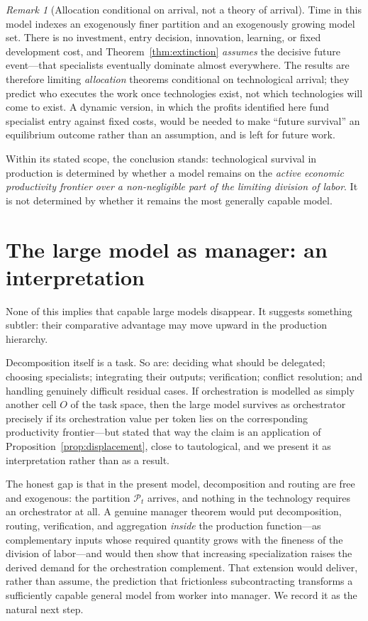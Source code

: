 \documentclass[11pt]{article}
\theoremstyle{definition}
\theoremstyle{remark}
\newtheorem{remark}{Remark}
\begin{document}
\begin{remark}[Allocation conditional on arrival, not a theory of arrival]
\label{rem:conditional}
Time in this model indexes an exogenously finer partition and an exogenously growing model set. There is no investment, entry decision, innovation, learning, or fixed development cost, and Theorem~\ref{thm:extinction} \emph{assumes} the decisive future event---that specialists eventually dominate almost everywhere. The results are therefore limiting \emph{allocation} theorems conditional on technological arrival; they predict who executes the work once technologies exist, not which technologies will come to exist. A dynamic version, in which the profits identified here fund specialist entry against fixed costs, would be needed to make ``future survival'' an equilibrium outcome rather than an assumption, and is left for future work.
\end{remark}

Within its stated scope, the conclusion stands: technological survival in production is determined by whether a model remains on the \emph{active economic productivity frontier over a non-negligible part of the limiting division of labor}. It is not determined by whether it remains the most generally capable model.

\section{The large model as manager: an interpretation}
\label{sec:manager}

None of this implies that capable large models disappear. It suggests something subtler: their comparative advantage may move upward in the production hierarchy.

Decomposition itself is a task. So are: deciding what should be delegated; choosing specialists; integrating their outputs; verification; conflict resolution; and handling genuinely difficult residual cases. If orchestration is modelled as simply another cell $O$ of the task space, then the large model survives as orchestrator precisely if its orchestration value per token lies on the corresponding productivity frontier---but stated that way the claim is an application of Proposition~\ref{prop:displacement}, close to tautological, and we present it as interpretation rather than as a result.

The honest gap is that in the present model, decomposition and routing are free and exogenous: the partition $\mathcal{P}_t$ arrives, and nothing in the technology requires an orchestrator at all. A genuine manager theorem would put decomposition, routing, verification, and aggregation \emph{inside} the production function---as complementary inputs whose required quantity grows with the fineness of the division of labor---and would then show that increasing specialization raises the derived demand for the orchestration complement. That extension would deliver, rather than assume, the prediction that frictionless subcontracting transforms a sufficiently capable general model from worker into manager. We record it as the natural next step.
\end{document}
